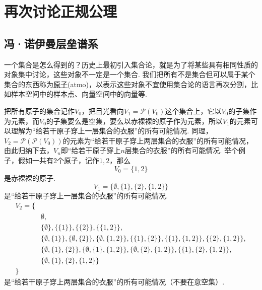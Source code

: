
\section{再次讨论正规公理}

\subsection{冯·诺伊曼层垒谱系}

一个集合是怎么得到的？历史上最初引入集合论，就是为了将某些具有相同性质的对象集中讨论，这些对象不一定是一个集合. 我们把所有不是集合但可以属于某个集合的东西称为\underline{原子}(atmo)，以表示这些对象不宜使用集合论的语言再次分割，比如样本空间中的样本点、向量空间中的向量等. 

把所有原子的集合记作\(V_0\)，把目光看向\(V_1 = \mathcal{P}(V_0)\)这个集合上，它以\(V_0\)的子集作为元素，而\(V_0\)的子集要么是空集，要么以赤裸裸的原子作为元素，所以\(V_1\)的元素可以理解为“给若干原子穿上一层集合的衣服”的所有可能情况. 同理，\(V_2 = \mathcal{P}(\mathcal{P}(V_0))\)的元素为“给若干原子穿上两层集合的衣服”的所有可能情况，由此归纳下去，\(V_n\)即“给若干原子穿上\(n\)层集合的衣服”的所有可能情况. 举个例子，假如一共有2个原子，记作\(1,2\)，那么
\[V_0 = \{1,2\}\]
是赤裸裸的原子.
\[V_1 = \{\emptyset,\{1\},\{2\},\{1,2\}\}\]
是“给若干原子穿上一层集合的衣服”的所有可能情况.
\begin{align*}
    V_2 = \{& \\
    &\emptyset,\\
    &\{\emptyset\},\{\{1\}\},\{\{2\}\},\{\{1,2\}\},\\
    &\{\emptyset,\{1\}\},\{\emptyset,\{2\}\},\{\emptyset,\{1,2\}\},\{\{1\},\{2\}\},\{\{1\},\{1,2\}\},\{\{2\},\{1,2\}\},\\
    &\{\emptyset,\{1\},\{2\}\},\{\emptyset,\{1\},\{1,2\}\},\{\emptyset,\{2\},\{1,2\}\},\{\{1\},\{2\},\{1,2\}\},\\
    &\{\emptyset,\{1\},\{2\},\{1,2\}\}\\
    \}
\end{align*}
是“给若干原子穿上两层集合的衣服”的所有可能情况（不要在意空集）.

